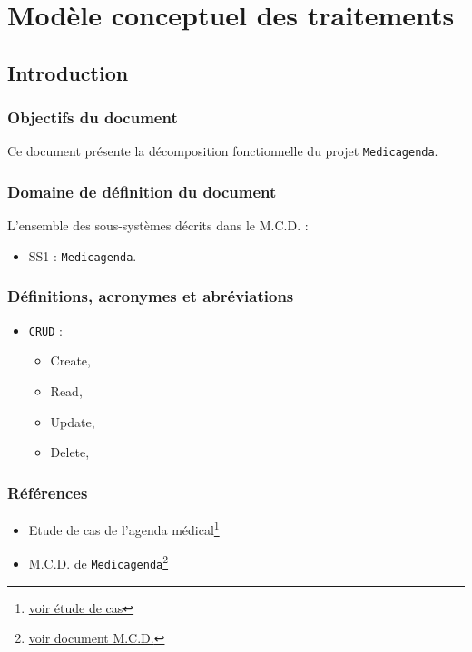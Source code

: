 \documentclass[a4paper, 11pt]{report}
\begin{document}

\tableofcontents

\chapter{Modèle conceptuel des traitements}

\section{Introduction}

\subsection{Objectifs du document}
Ce document présente la décomposition fonctionnelle du projet \texttt{Medicagenda}.
\subsection{Domaine de définition du document}
L'ensemble des sous-systèmes décrits dans le M.C.D. :
\begin{itemize}
	\item SS1 : \texttt{Medicagenda}.
\end{itemize}
\subsection{Définitions, acronymes et abréviations}
\begin{itemize}
	\item \texttt{CRUD} :
		\begin{itemize}
			\item[] Create,
			\item[] Read,
			\item[] Update,
			\item[] Delete,
		\end{itemize}
\end{itemize}
\subsection{Références}
\begin{itemize}
	\item[] Etude de cas de l'agenda
		médical\footnote{\href{../Enonce_Travail_Synthese_14-15.pdf}{voir
		étude de cas}}
	\item[] M.C.D. de \texttt{Medicagenda}\footnote{\href{../MCD/MCD.pdf}{voir document M.C.D.}}
\end{itemize}
\newpage
\end{document}
